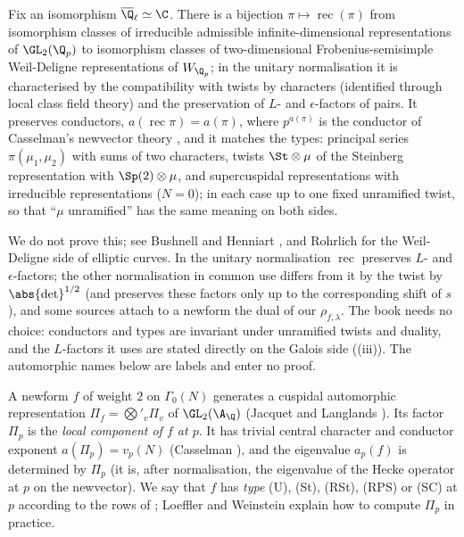 \begin{theorem}\label{thm:modgalrep:local-langlands}
Fix an isomorphism $\overline\Q_\ell\simeq\C$. There is a bijection $\pi\mapsto\operatorname{rec}(\pi)$ from isomorphism classes of irreducible admissible
infinite-dimensional representations of $\GL_2(\Q_p)$ to isomorphism classes of two-dimensional Frobenius-semisimple Weil-Deligne
representations of $W_{\Q_p}$; in the unitary normalisation it is characterised by the compatibility with twists by characters (identified through local
class field theory) and the preservation of $L$- and $\epsilon$-factors of pairs. It preserves conductors, $a(\operatorname{rec}\pi)=a(\pi)$, where $p^{a(\pi)}$ is the conductor of Casselman's
newvector theory \cite{Casselman73}, and it matches the types: principal series $\pi(\mu_1,\mu_2)$ with sums of two characters, twists $\St\otimes\mu$ of
the Steinberg representation with $\Sp(2)\otimes\mu$, and supercuspidal representations with irreducible representations ($N=0$); in each case
up to one fixed unramified twist, so that ``$\mu$ unramified'' has the same meaning on both sides.
\end{theorem}

We do not prove this; see Bushnell and Henniart \cite{BushnellHenniart06}, and Rohrlich \cite{Rohrlich94} for the Weil-Deligne side of elliptic
curves. In the unitary normalisation $\operatorname{rec}$ preserves $L$- and $\epsilon$-factors; the other normalisation in common use differs from it by the twist by
$\abs{\det}^{1/2}$ (and preserves these factors only up to the corresponding shift of $s$), and some sources attach to a newform the dual of our
$\rho_{f,\lambda}$. The book needs no choice: conductors and types are invariant under unramified twists and duality, and the $L$-factors it uses are stated
directly on the Galois side ((iii)). The automorphic names below are labels and enter no proof.

\begin{definition}\label{def:modgalrep:local-component}
A newform $f$ of weight $2$ on $\Gamma_0(N)$ generates a cuspidal automorphic representation $\Pi_f=\bigotimes'_v\Pi_v$ of $\GL_2(\A_\Q)$ (Jacquet and Langlands
\cite{JacquetLanglands70}). Its factor $\Pi_p$ is the \emph{local component of $f$ at $p$}. It has trivial central character and conductor exponent
$a(\Pi_p)=v_p(N)$ (Casselman \cite{Casselman73}), and the eigenvalue $a_p(f)$ is determined by $\Pi_p$ (it is, after normalisation, the eigenvalue of the
Hecke operator at $p$ on the newvector). We say that $f$ has \emph{type} (U), (St), (RSt), (RPS) or (SC) at $p$ according to the rows of
; Loeffler and Weinstein \cite{LoefflerWeinstein12} explain how to compute $\Pi_p$ in practice.
\end{definition}

